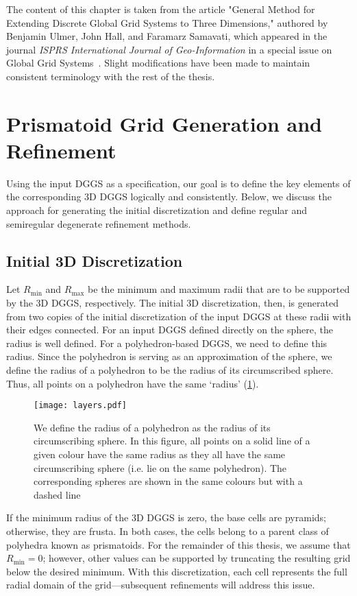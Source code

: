 The content of this chapter is taken from the article "General Method for Extending Discrete Global Grid Systems to Three Dimensions," authored by Benjamin Ulmer, John Hall, and Faramarz Samavati, which appeared in the journal \textit{ISPRS International Journal of Geo-Information} in a special issue on Global Grid Systems~\cite{ulmer2020general}.
Slight modifications have been made to maintain consistent terminology with the rest of the thesis.


\section{Prismatoid Grid Generation and Refinement} \label{chap:5:grid}
Using the input DGGS as a specification, our goal is to define the key elements of the corresponding 3D DGGS logically and consistently.
Below, we discuss the approach for generating the initial discretization and define regular and semiregular degenerate refinement methods. 


\subsection{Initial 3D Discretization} \label{chap:5:discretization}
Let $R_\mathrm{min}$ and $R_\mathrm{max}$ be the minimum and maximum radii that are to be supported by the 3D DGGS, respectively.
The initial 3D discretization, then, is generated from two copies of the initial discretization of the input DGGS at these radii with their edges connected.
For an input DGGS defined directly on the sphere, the radius is well defined.
For a polyhedron-based DGGS, we need to define this radius.
Since the polyhedron is serving as an approximation of the sphere, we define the radius of a polyhedron to be the radius of its circumscribed sphere.
Thus, all points on a polyhedron have the same `radius' (\cref{fig:layers}).


\begin{figure}[ht!]
	\centering
	\texttt{[image: layers.pdf]}
	\caption[How the radius of a polyhedron is defined]{
		We define the radius of a polyhedron as the radius of its circumscribing sphere.
		In this figure, all points on a solid line of a given colour have the same radius as they all have the same circumscribing sphere (i.e. lie on the same polyhedron).
		The corresponding spheres are shown in the same colours but with a dashed line
	}
	\label{fig:layers}
\end{figure}


If the minimum radius of the 3D DGGS is zero, the base cells are pyramids; otherwise, they are frusta.
In both cases, the cells belong to a parent class of polyhedra known as prismatoids.
For the remainder of this thesis, we assume that $R_\mathrm{min} = 0$; however, other values can be supported by truncating the resulting grid below the desired minimum.
With this discretization, each cell represents the full radial domain of the grid---subsequent refinements will address this issue.


